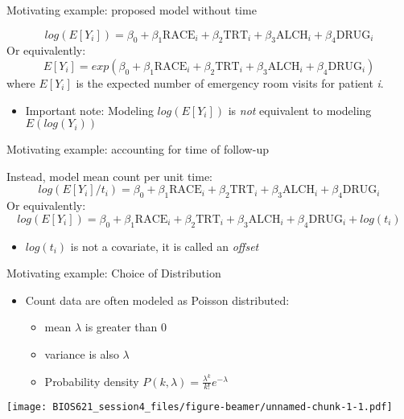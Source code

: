 \documentclass[ignorenonframetext,]{beamer}
\providecommand{\tightlist}{%
  \setlength{\itemsep}{0pt}\setlength{\parskip}{0pt}}
\begin{document}
\begin{frame}{Motivating example: proposed model without time}

\[
log(E[Y_i]) = \beta_0 + \beta_1 \textrm{RACE}_i + \beta_2 \textrm{TRT}_i + \beta_3 \textrm{ALCH}_i + \beta_4 \textrm{DRUG}_i
\] Or equivalently: \[
E[Y_i] = exp \left( \beta_0 + \beta_1 \textrm{RACE}_i + \beta_2 \textrm{TRT}_i + \beta_3 \textrm{ALCH}_i + \beta_4 \textrm{DRUG}_i \right)
\] where \(E[Y_i]\) is the expected number of emergency room visits for
patient \emph{i}.

\begin{itemize}
\tightlist
\item
  Important note: Modeling \(log(E[Y_i])\) is \emph{not} equivalent to
  modeling \(E(log(Y_i))\)
\end{itemize}

\end{frame}

\begin{frame}{Motivating example: accounting for time of follow-up}

Instead, model mean count per unit time: \[
log(E[Y_i]/t_i) = \beta_0 + \beta_1 \textrm{RACE}_i + \beta_2 \textrm{TRT}_i + \beta_3 \textrm{ALCH}_i + \beta_4 \textrm{DRUG}_i
\] Or equivalently: \[
log(E[Y_i]) = \beta_0 + \beta_1 \textrm{RACE}_i + \beta_2 \textrm{TRT}_i + \beta_3 \textrm{ALCH}_i + \beta_4 \textrm{DRUG}_i + log(t_i)
\]

\begin{itemize}
\tightlist
\item
  \(log(t_i)\) is not a covariate, it is called an \emph{offset}
\end{itemize}

\end{frame}

\begin{frame}{Motivating example: Choice of Distribution}

\begin{itemize}
\tightlist
\item
  Count data are often modeled as Poisson distributed:

  \begin{itemize}
  \tightlist
  \item
    mean \(\lambda\) is greater than 0
  \item
    variance is also \(\lambda\)
  \item
    Probability density
    \(P(k, \lambda) = \frac{\lambda^k}{k!} e^{-\lambda}\)
  \end{itemize}
\end{itemize}

\texttt{[image: BIOS621\_session4\_files/figure-beamer/unnamed-chunk-1-1.pdf]}

\end{frame}
\end{document}
